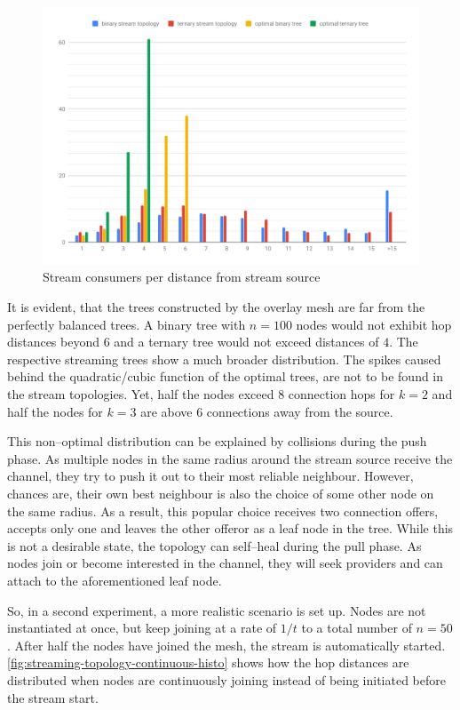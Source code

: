 \begin{figure}
\centering
\includegraphics[width=1\textwidth]{graphics/analysis/streaming-topology-histogram.pdf}
\caption{Stream consumers per distance from stream source}
\label{fig:streaming-topology-histogram}
\end{figure}

It is evident, that the trees constructed by the overlay mesh are far from the perfectly balanced trees. A binary tree with $n=100$ nodes would not exhibit hop distances beyond $6$ and a ternary tree would not exceed distances of $4$. The respective streaming trees show a much broader distribution. The spikes caused behind the quadratic/cubic function of the optimal trees, are not to be found in the stream topologies. Yet, half the nodes exceed $8$ connection hops for $k=2$ and half the nodes for $k=3$ are above $6$ connections away from the source.

This non–optimal distribution can be explained by collisions during the push phase. As multiple nodes in the same radius around the stream source receive the channel, they try to push it out to their most reliable neighbour. However, chances are, their own best neighbour is also the choice of some other node on the same radius. As a result, this popular choice receives two connection offers, accepts only one and leaves the other offeror as a leaf node in the tree. While this is not a desirable state, the topology can self–heal during the pull phase. As nodes join or become interested in the channel, they will seek providers and can attach to the aforementioned leaf node.

So, in a second experiment, a more realistic scenario is set up. Nodes are not instantiated at once, but keep joining at a rate of $1/t$ to a total number of $n=50$. After half the nodes have joined the mesh, the stream is automatically started. \vref{fig:streaming-topology-continuous-histo} shows how the hop distances are distributed when nodes are continuously joining instead of being initiated before the stream start.

